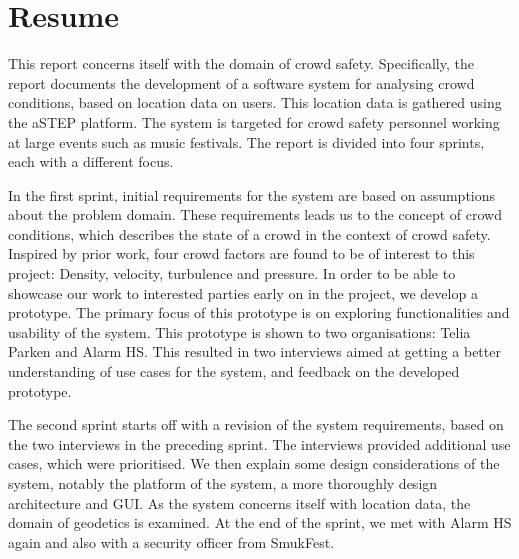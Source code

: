 \chapter*{Resume}

This report concerns itself with the domain of crowd safety. Specifically, the report documents the development of a software system for analysing crowd conditions, based on location data on users. This location data is gathered using the aSTEP platform. The system is targeted for crowd safety personnel working at large events such as music festivals. The report is divided into four sprints, each with a different focus.

In the first sprint, initial requirements for the system are based on assumptions about the problem domain. These requirements leads us to the concept of crowd conditions, which describes the state of a crowd in the context of crowd safety. Inspired by prior work, four crowd factors are found to be of interest to this project: Density, velocity, turbulence and pressure. In order to be able to showcase our work to interested parties early on in the project, we develop a prototype. The primary focus of this prototype is on exploring functionalities and usability of the system. This prototype is shown to two organisations: Telia Parken and Alarm HS. This resulted in two interviews aimed at getting a better understanding of use cases for the system, and feedback on the developed prototype.

The second sprint starts off with a revision of the system requirements, based on the two interviews in the preceding sprint. The interviews provided additional use cases, which were prioritised. We then explain some design considerations of the system, notably the platform of the system, a more thoroughly design architecture and GUI. As the system concerns itself with location data, the domain of geodetics is examined. At the end of the sprint, we met with Alarm HS again and also with a security officer from SmukFest.